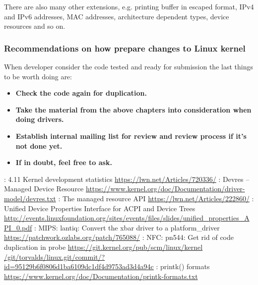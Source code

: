 \documentclass[10pt, a5paper]{article}
\begin{document}
There are also many other extensions, e.g. printing buffer in escaped format, IPv4 and IPv6 addresses, MAC addresses, architecture dependent types, device resources and so on.

\subsubsection*{Recommendations on how prepare changes to Linux kernel}

When developer consider the code tested and ready for submission the last things to be worth doing are:

\begin{itemize}
  \item \textbf{Check the code again for duplication.}
  \item \textbf{Take the material from the above chapters into consideration when doing drivers.}
  \item \textbf{Establish internal mailing list for review and review process if it’s not done yet.}
  \item \textbf{If in doubt, feel free to ask.}
\end{itemize}

\begin{thebibliography}{99}

: 4.11 Kernel development statistics \url{https://lwn.net/Articles/720336/}
: Devres -- Managed Device Resource \url{https://www.kernel.org/doc/Documentation/driver-model/devres.txt}
: The managed resource API \url{https://lwn.net/Articles/222860/}
: Unified Device Properties Interface for ACPI and Device Trees \url{http://events.linuxfoundation.org/sites/events/files/slides/unified_properties_API_0.pdf}
: MIPS: lantiq: Convert the xbar driver to a platform\_driver \url{https://patchwork.ozlabs.org/patch/765088/}
: NFC: pn544: Get rid of code duplication in probe \url{https://git.kernel.org/pub/scm/linux/kernel /git/torvalds/linux.git/commit/?id=95129b6f0806d1ba6109dc1df4d9753ad3d4a94c}
: printk() formats \url{https://www.kernel.org/doc/Documentation/printk-formats.txt}
\end{thebibliography}
\end{document}
